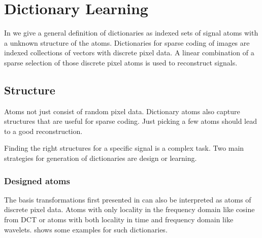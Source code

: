 \chapter{Dictionary Learning}
In  we give a general definition of dictionaries 
as indexed sets of signal atoms with a unknown structure of the atoms.
Dictionaries for sparse coding of images are indexed collections of vectors with
discrete pixel data. A linear combination of a sparse selection of those
discrete pixel atoms is used to reconstruct signals. 

\section{Structure}
Atoms not just consist of random pixel data. Dictionary atoms also capture
structures that are useful for sparse coding. Just picking a few atoms should
lead to a good reconstruction. 

Finding the right structures for a specific signal is a complex task.
Two main strategies for generation of dictionaries are design or
learning.

\subsection{Designed atoms}
The basis transformations first presented in  can also
be interpreted as atoms of discrete pixel data. Atoms with only
locality in the frequency domain like cosine from DCT or atoms with both
locality in time and frequency domain like wavelets.
 shows some examples for such
dictionaries. 


